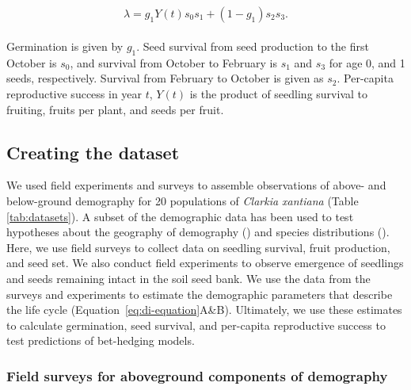 \documentclass[12pt, oneside, titlepage]{article}   	%
\begin{document}
 \begin{align}
  \begin{split}
\lambda = g_1Y(t) s_0 s_1 + (1-g_1) s_2 s_3.  \label{eq:di-equation}
  \end{split}
\end{align}

Germination is given by $g_1$. Seed survival from seed production to the first October is $s_0$, and survival from October to February is $s_1$ and $s_3$ for age 0, and 1 seeds, respectively. Survival from February to October is given as $s_2$. Per-capita reproductive success in year $t$, $Y(t)$ is the product of seedling survival to fruiting, fruits per plant, and seeds per fruit.

\subsection{Creating the dataset}

We used field experiments and surveys to assemble observations of above- and below-ground demography for 20 populations of \textit{Clarkia xantiana} (Table \ref{tab:datasets}). A subset of the demographic data has been used to test hypotheses about the geography of demography (\cite{eckhart2011}) and species distributions (\cite{pironon2018}). Here, we use field surveys to collect data on seedling survival, fruit production, and seed set. We also conduct field experiments to observe emergence of seedlings and seeds remaining intact in the soil seed bank. We use the data from the surveys and experiments to estimate the demographic parameters that describe the life cycle (Equation~\ref{eq:di-equation}A\&B). Ultimately, we use these estimates to calculate germination, seed survival, and per-capita reproductive success to test predictions of bet-hedging models.

%
\begin{singlespace*}
 \label{tab:datasets} 
\begin{center}

\end{center}
\end{singlespace*} 

\subsubsection{Field surveys for aboveground components of demography}
\end{document}
